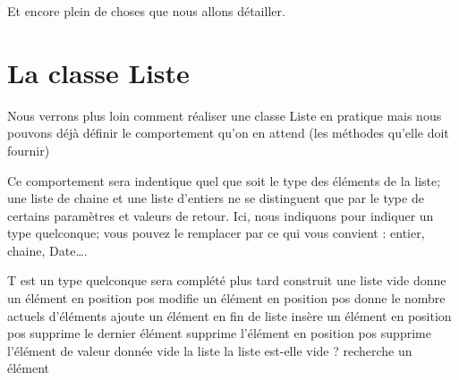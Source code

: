 Et encore plein de choses que nous allons détailler.

\section{La classe Liste}

Nous verrons plus loin comment réaliser une classe Liste en pratique 
mais nous pouvons déjà définir le comportement qu’on en attend 
(les méthodes qu’elle doit fournir)

Ce comportement sera indentique quel que soit le type des éléments
de la liste; une liste de chaine et une liste d'entiers
ne se distinguent que par le type de certains paramètres
et valeurs de retour.
Ici, nous indiquons  pour indiquer un type quelconque;
vous pouvez le remplacer par ce qui vous convient : entier, chaine, Date\dots.

\begin{Pseudocode}
		\RComment T est un type quelconque
		\Private
			\LComment sera complété plus tard	
		\Public
				\RComment construit une liste vide
				\RComment donne un élément en position pos
				\RComment modifie un élément en position pos
				\RComment donne le nombre actuels d’éléments
				\RComment ajoute un élément en fin de liste
				\RComment insère un élément en position pos
				\RComment supprime le dernier élément
				\RComment supprime l'élément en position pos
				\RComment supprime l'élément de valeur donnée
				\RComment vide la liste
				\RComment la liste est-elle vide ?
				\RComment recherche un élément
		\EndClass
\end{Pseudocode}

\bigskip

